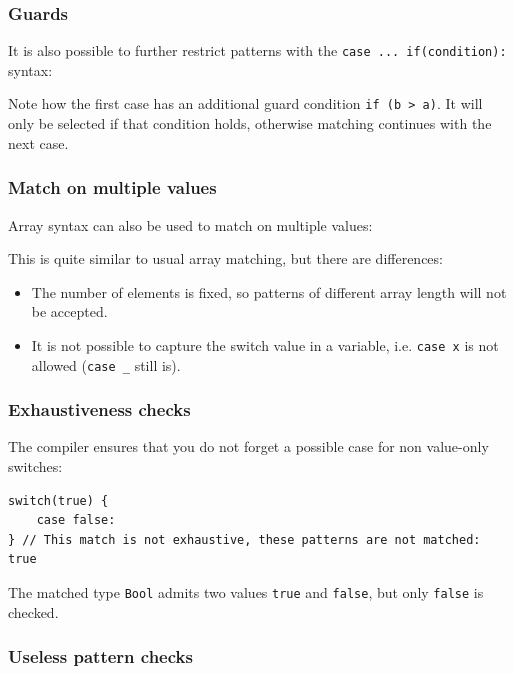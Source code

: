 \documentclass{article}
\newcommand{\type}[1]{\texttt{#1}}
\newcommand{\expr}[1]{\texttt{#1}}
\begin{document}
\subsubsection{Guards}

It is also possible to further restrict patterns with the \expr{case ... if(condition):} syntax:



Note how the first case has an additional guard condition \expr{if (b > a)}. It will only be selected if that condition holds, otherwise matching continues with the next case.

\subsubsection{Match on multiple values}

Array syntax can also be used to match on multiple values:



This is quite similar to usual array matching, but there are differences:

\begin{itemize}
	\item The number of elements is fixed, so patterns of different array length will not be accepted.
	\item It is not possible to capture the switch value in a variable, i.e. \expr{case x} is not allowed (\expr{case _} still is).
\end{itemize}

\subsubsection{Exhaustiveness checks}

The compiler ensures that you do not forget a possible case for non value-only switches:

\begin{lstlisting}
switch(true) {
    case false:
} // This match is not exhaustive, these patterns are not matched: true
\end{lstlisting}

The matched type \type{Bool} admits two values \expr{true} and \expr{false}, but only \expr{false} is checked. 

\subsubsection{Useless pattern checks}
\end{document}
